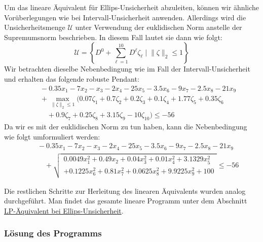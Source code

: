 \documentclass[a4paper,12pt]{article}
\begin{document}
Um das lineare \"Aquivalent f\"ur Ellips-Unsicherheit abzuleiten, k\"onnen wir \"ahnliche Vor\"uberlegungen wie bei Intervall-Unsicherheit anwenden. Allerdings wird die Unsicherheitsmenge $\mathcal{U}$ unter Verwendung der euklidischen Norm anstelle der Supremumsnorm beschrieben. In diesem Fall lautet sie dann wie folgt:
\[
\mathcal{U} = \left\{ D^0 + \sum_{\ell=1}^{10}D^{\ell} \zeta_{\ell} \;\vert\; \|\zeta\|_2 \leq 1 \right\}
\]
Wir betrachten dieselbe Nebenbedingung wie im Fall der Intervall-Unsicherheit und erhalten das folgende robuste Pendant:
\[
\begin{aligned}
    &\quad -0.35x_1 - 7x_2 - x_3 - 2x_4 - 25x_5 - 3.5x_6 - 9x_7 - 2.5x_8 - 21x_9 \\
    &\quad + \max_{\|\zeta\|_2 \leq 1} \big( 0.07\zeta_1 + 0.7\zeta_2 + 0.2\zeta_3 + 0.1\zeta_4 + 1.77\zeta_5 +  0.35\zeta_6\\
    &\qquad + 0.9\zeta_7 + 0.25\zeta_8 + 3.15\zeta_9 - 10\zeta_{10} \big) \leq -56
\end{aligned}
\]
Da wir es mit der euklidischen Norm zu tun haben, kann die Nebenbedingung wie folgt umformuliert werden:
\[
\begin{aligned}
    &\quad -0.35x_1 - 7x_2 - x_3 - 2x_4 - 25x_5 - 3.5x_6 - 9x_7 - 2.5x_8 - 21x_9 \\
    &\qquad + \sqrt{
        \begin{aligned}0.0049x_1^2 + 0.49x_2 + 0.04x_3^2 + 0.01x_4^2 + 3.1329x_5^2 \\
            + 0.1225x_6^2 + 0.81x_7^2 + 0.0625x_8^2 + 9.9225x_9^2 + 100 \end{aligned}
            } \leq -56
\end{aligned}
\]

Die restlichen Schritte zur Herleitung des linearen \"Aquivalents wurden analog durchgef\"uhrt. Man findet das gesamte lineare Programm unter dem Abschnitt \hyperref[sec:lp-equivalent-ellips]{LP-\"Aquivalent bei Ellips-Unsicherheit}.

\subsubsection*{L\"osung des Programms}
\end{document}
